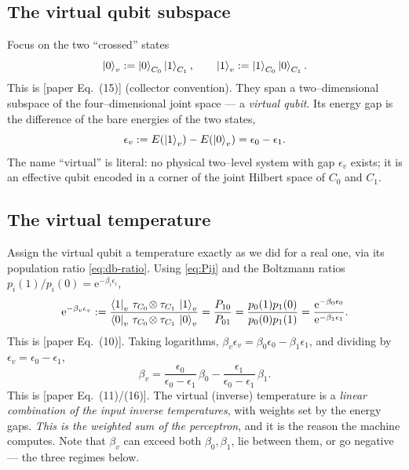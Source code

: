 \documentclass[11pt,a4paper]{article}
\newcommand{\ee}{\mathrm{e}}
\theoremstyle{definition}
\theoremstyle{remark}
\begin{document}
\subsection{The virtual qubit subspace}
Focus on the two ``crossed'' states
\begin{equation}
\ket{0}_v := \ket{0}_{C_0}\ket{1}_{C_1},\qquad
\ket{1}_v := \ket{1}_{C_0}\ket{0}_{C_1}.
\label{eq:virtual-states}
\end{equation}
This is [paper Eq.~(15)] (collector convention). They span a
two--dimensional subspace of the four--dimensional joint space --- a
\emph{virtual qubit}. Its energy gap is the difference of the bare
energies of the two states,
\begin{equation}
\epsilon_v := E(\ket{1}_v) - E(\ket{0}_v) = \epsilon_0 - \epsilon_1 .
\label{eq:eps-v}
\end{equation}
The name ``virtual'' is literal: no physical two--level system with gap
$\epsilon_v$ exists; it is an effective qubit encoded in a corner of the
joint Hilbert space of $C_0$ and $C_1$.

\subsection{The virtual temperature}
Assign the virtual qubit a temperature exactly as we did for a real one,
via its population ratio \eqref{eq:db-ratio}. Using
\eqref{eq:Pij} and the Boltzmann ratios
$p_i(1)/p_i(0)=\ee^{-\beta_i\epsilon_i}$,
\begin{equation}
\ee^{-\beta_v\epsilon_v}
:= \frac{\bra{1}_v\,\tau_{C_0}\!\otimes\tau_{C_1}\,\ket{1}_v}
        {\bra{0}_v\,\tau_{C_0}\!\otimes\tau_{C_1}\,\ket{0}_v}
= \frac{P_{10}}{P_{01}}
= \frac{p_0(1)p_1(0)}{p_0(0)p_1(1)}
= \frac{\ee^{-\beta_0\epsilon_0}}{\ee^{-\beta_1\epsilon_1}} .
\label{eq:betav-ratio}
\end{equation}
This is [paper Eq.~(10)]. Taking logarithms,
$\beta_v\epsilon_v = \beta_0\epsilon_0-\beta_1\epsilon_1$, and dividing
by $\epsilon_v=\epsilon_0-\epsilon_1$,
\begin{equation}
\boxed{\;
\beta_v = \frac{\epsilon_0}{\epsilon_0-\epsilon_1}\,\beta_0
        - \frac{\epsilon_1}{\epsilon_0-\epsilon_1}\,\beta_1 .
\;}
\label{eq:betav}
\end{equation}
This is [paper Eq.~(11)/(16)]. The virtual (inverse) temperature is a
\emph{linear combination of the input inverse temperatures}, with
weights set by the energy gaps. \emph{This is the weighted sum of the
perceptron}, and it is the reason the machine computes. Note that
$\beta_v$ can exceed both $\beta_0,\beta_1$, lie between them, or go
negative --- the three regimes below.
\end{document}
